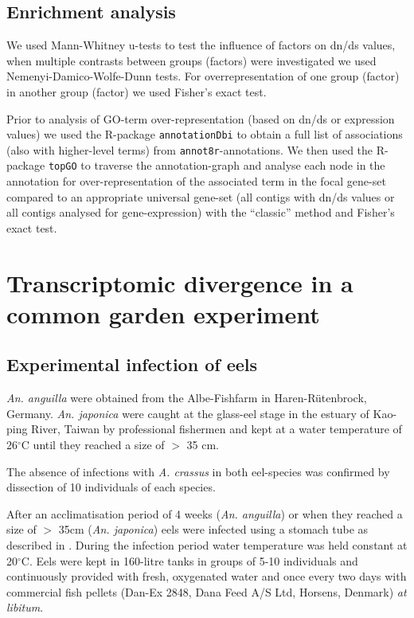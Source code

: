 \subsection{Enrichment analysis}
\label{GO-over-meth}

We used Mann-Whitney u-tests to test the influence of factors on dn/ds
values, when multiple contrasts between groups (factors) were
investigated we used Nemenyi-Damico-Wolfe-Dunn tests. For
overrepresentation of one group (factor) in another group (factor) we
used Fisher's exact test.

Prior to analysis of GO-term over-representation (based on dn/ds or
expression values) we used the R-package \texttt{annotationDbi}
\cite{AnnotationDbi} to obtain a full list of associations (also with
higher-level terms) from \texttt{annot8r}-annotations. We then used the
R-package \texttt{topGO} \cite{topGO} to traverse the annotation-graph
and analyse each node in the annotation for over-representation of the
associated term in the focal gene-set compared to an appropriate
universal gene-set (all contigs with dn/ds values or all contigs
analysed for gene-expression) with the ``classic'' method and Fisher's
exact test.

\section{Transcriptomic divergence in a common garden experiment}

\subsection{Experimental infection of eels}

\textit{An. anguilla} were obtained from the Albe-Fishfarm in
Haren-R\"utenbrock, Germany. \textit{An. japonica} were caught at the
glass-eel stage in the estuary of Kao-ping River, Taiwan by
professional fishermen and kept at a water temperature of
26$^{\circ}$C until they reached a size of $>$ 35 cm.

The absence of infections with \textit{A. crassus} in both eel-species
was confirmed by dissection of 10 individuals of each species.

After an acclimatisation period of 4 weeks (\textit{An. anguilla}) or
when they reached a size of $>$ 35cm (\textit{An. japonica}) eels were
infected using a stomach tube as described in
\cite{boon1990effect}. During the infection period water temperature
was held constant at 20$^{\circ}$C. Eels were kept in 160-litre tanks
in groups of 5-10 individuals and continuously provided with fresh,
oxygenated water and once every two days with commercial fish pellets
(Dan-Ex 2848, Dana Feed A/S Ltd, Horsens, Denmark) \textit{at
  libitum}.

